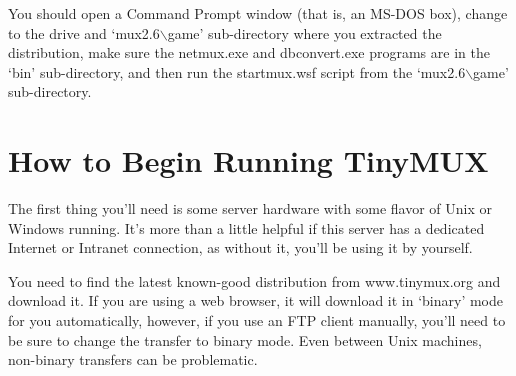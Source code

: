 \documentclass[10pt,letterpaper]{book}
\begin{document}
You should open a Command Prompt window (that is, an MS-DOS box), change to
the drive and `mux2.6$\backslash$game' sub-directory where you extracted the
distribution, make sure the netmux.exe and dbconvert.exe
programs are in the `bin' sub-directory, and then run the startmux.wsf
script from the `mux2.6$\backslash$game' sub-directory.
\section{How to Begin Running TinyMUX}
The first thing you'll need is some server hardware with some flavor of Unix or
Windows running. It's more than a little helpful if this server has a dedicated
Internet or Intranet connection, as without it, you'll be using it by yourself.

You need to find the latest known-good distribution from
www.tinymux.org and download it. If you are using a web browser, it will
download it in `binary' mode for you automatically, however, if you use an FTP
client manually, you'll need to be sure to change the transfer to binary mode.
Even between Unix machines, non-binary transfers can be problematic.
\end{document}
